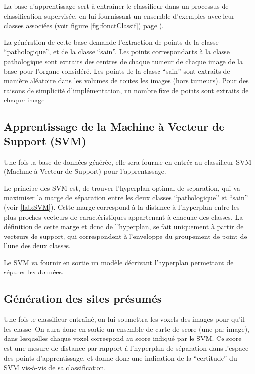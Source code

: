 La base d'apprentissage sert à entraîner le classifieur dans un processus de classification supervisée, en lui fournissant un ensemble d'exemples avec leur classes associées (voir figure \ref{fig:fonctClassif}) page \pageref{fig:fonctClassif}).

La génération de cette base demande l'extraction de points de la classe ``pathologique'', et de la classe ``sain''. Les points correspondants à la classe pathologique sont extraits des centres de chaque tumeur de chaque image de la base pour l'organe considéré. Les points de la classe ``sain'' sont extraits de manière aléatoire dans les volumes de toutes les images (hors tumeurs). Pour des raisons de simplicité d'implémentation, un nombre fixe de points sont extraits de chaque image.

\subsection{Apprentissage de la Machine à Vecteur de Support (SVM)}

Une fois la base de données générée, elle sera fournie en entrée au classifieur SVM (Machine à Vecteur de Support) pour l'apprentissage.

Le principe des SVM est, de trouver l’hyperplan optimal de séparation, qui va maximiser la marge de séparation entre les deux classes ``pathologique''  et ``sain'' (voir \ref{lab:SVM}). Cette marge correspond à la distance à l’hyperplan entre les plus proches vecteurs de caractéristiques appartenant à chacune des classes. La définition de cette marge et donc de l’hyperplan, se fait uniquement à partir de vecteurs de support, qui correspondent à l'enveloppe du groupement de point de l'une des deux classes.

Le SVM va fournir en sortie un modèle décrivant l'hyperplan permettant de séparer les données.

\subsection{Génération des sites présumés}
\label{lab:aggregatsCAD}
Une fois le classifieur entraîné, on lui soumettra les voxels des images pour qu'il les classe. On aura donc en sortie un ensemble de carte de score (une par image), dans lesquelles chaque voxel correspond au score indiqué par le SVM. Ce score est une mesure de distance par rapport à l'hyperplan de séparation dans l'espace des points d'apprentissage, et donne donc une indication de la ``certitude'' du SVM vis-à-vis de sa classification.

